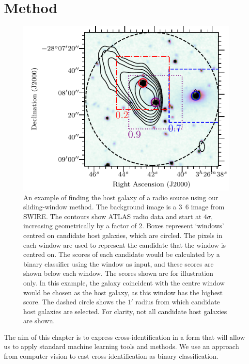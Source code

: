 \documentclass[11pt, a4paper]{book}
\begin{document}
  \section{Method}\label{sec:atlas-xid-method}
    \begin{figure}
      \centering
      \includegraphics[width=0.6\columnwidth]{atlas-images/figure_example_of_method.pdf}
      \caption[An example of {finding} the host galaxy of a radio source using
        our sliding-window method.]{An example of {finding} the host galaxy of a radio source using
        our sliding-window method. The background image is a \unit{3.6}{\micro\meter} image from SWIRE. The contours show ATLAS radio data and start at $4\sigma$, increasing geometrically by a factor of 2. Boxes represent `windows'
        centred on {candidate host galaxies, which are circled. The pixels in each window are used to represent the candidate that the window is centred
        on. The scores of each candidate would be calculated by a binary classifier using the window as input,
        and these scores are shown below each window}. The scores
        shown are for illustration only. In this example,
        {the galaxy coincident with the centre window would be chosen as the host galaxy, as this
        window has the highest score.
        The dashed circle
        shows the $1'$ radius from which candidate host galaxies are selected. For clarity, not all candidate host galaxies are shown.}}
      \label{fig:windows}
    \end{figure}

  {The aim of this chapter is to express cross-identification in a form that
  will allow us to apply standard machine learning tools and methods. We use an approach from computer vision
  to cast cross-identification as binary classification.}
\end{document}
